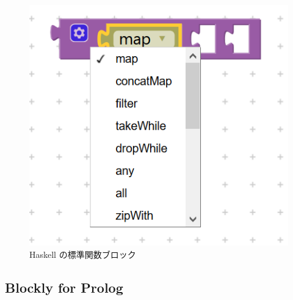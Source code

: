 \documentclass{risepaper}
\begin{document}
\begin{itemize}
\begin{figure}[h]
\begin{center}
\includegraphics[scale=0.5]{img/haskell_standard_functions.PNG}
\caption{Haskell の標準関数ブロック}%
\label{fig:haskell_standard_functions}
\end{center}%
\end{figure}%

\end{itemize} 

   \subsection{Blockly for Prolog}
   
\end{document}
